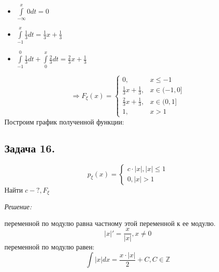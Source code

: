 \begin{itemize}
	\item $\int\limits_{-\infty}^{x}0dt = 0$
	\item $\int\limits_{-1}^{x} \frac{1}{3}dt = \frac{1}{3}x + \frac{1}{3}$
	\item $\int\limits_{-1}^{0} \frac{1}{3} dt + \int\limits_{0}^x \frac{2}{3}dt = \frac{2}{3}x + \frac{1}{3}$
\end{itemize}
\[ \Rightarrow F_{\xi}(x) = 
\begin{cases}
	0, &x \le -1 \\
	\frac{1}{3}x + \frac{1}{3}, &x \in (-1,0] \\
	\frac{2}{3}x + \frac{1}{3}, &x \in (0,1] \\
	1, &x > 1
\end{cases}
\]
Построим график полученной функции:
\begin{figure}[H]
\end{figure}

\subsection*{Задача 16.}

\[
p_{\xi}(x) =
\begin{cases}
	c \cdot |x|, |x| \le 1 \\
	0, |x| > 1
\end{cases}
\]
Найти $c - ?, F_{\xi}$

\noindent \textit{Решение:}

 переменной по модулю равна частному этой переменной к ее модулю.
\[ |x|' = \frac{x}{|x|}, x \ne 0 \]
 переменной по модулю равен:
\[ \int |x|dx = \frac{x \cdot |x|}{2} + C, C \in \mathbb{Z} \]


